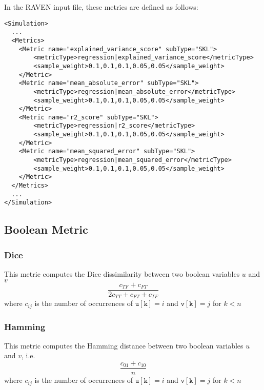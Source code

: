
In the RAVEN input file, these metrics are defined as follows:
\begin{lstlisting}[style=XML]
<Simulation>
  ...
  <Metrics>
    <Metric name="explained_variance_score" subType="SKL">
        <metricType>regression|explained_variance_score</metricType>
        <sample_weight>0.1,0.1,0.1,0.05,0.05</sample_weight>
    </Metric>
    <Metric name="mean_absolute_error" subType="SKL">
        <metricType>regression|mean_absolute_error</metricType>
        <sample_weight>0.1,0.1,0.1,0.05,0.05</sample_weight>
    </Metric>
    <Metric name="r2_score" subType="SKL">
        <metricType>regression|r2_score</metricType>
        <sample_weight>0.1,0.1,0.1,0.05,0.05</sample_weight>
    </Metric>
    <Metric name="mean_squared_error" subType="SKL">
        <metricType>regression|mean_squared_error</metricType>
        <sample_weight>0.1,0.1,0.1,0.05,0.05</sample_weight>
    </Metric>
  </Metrics>
  ...
</Simulation>
\end{lstlisting}

\subsection{Boolean Metric}
\label{subsection:boolean}

\subsubsection{Dice}
This metric computes the Dice dissimilarity between two boolean variables $u$ and $v$
\begin{equation}
  \frac{c_{TF} + c_{FT}}{2c_{TT} + c_{FT} + c_{TF}}
\end{equation}
where $c_{ij}$ is the number of occurrences of $\mathtt{u[k]} = i$ and $\mathtt{v[k]} = j$ for $k < n$


\subsubsection{Hamming}
This metric computes the Hamming distance between two boolean variables $u$ and $v$, i.e.
\begin{equation}
  \frac{c_{01} + c_{10}}{n}
\end{equation}
where $c_{ij}$ is the number of occurrences of $\mathtt{u[k]} = i$ and $\mathtt{v[k]} = j$ for $k < n$

